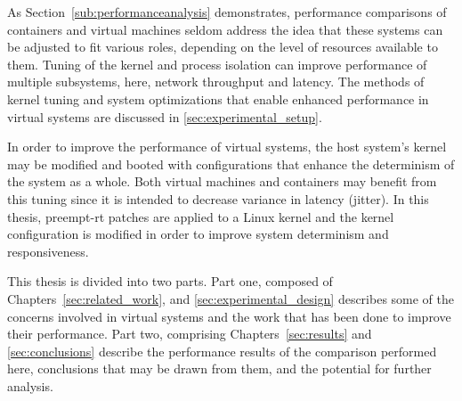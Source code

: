 As Section~\ref{sub:performanceanalysis} demonstrates, performance comparisons of containers and virtual machines seldom address the idea that these systems can be adjusted to fit various roles, depending on the level of resources available to them.  
Tuning of the kernel and process isolation can improve performance of multiple subsystems, here, network throughput and latency.  
The methods of kernel tuning and system optimizations that enable enhanced performance in virtual systems are discussed in \ref{sec:experimental_setup}.

In order to improve the performance of virtual systems, the host system's kernel may be modified and booted with configurations that enhance the determinism of the system as a whole.
Both virtual machines and containers may benefit from this tuning since it is intended to decrease variance in latency (jitter).  
In this thesis, preempt-rt patches are applied to a Linux kernel and the kernel configuration is modified in order to improve system determinism and responsiveness. 

This thesis is divided into two parts.
Part one, composed of Chapters~\ref{sec:related_work}, and \ref{sec:experimental_design} describes some of the concerns involved in virtual systems and the work that has been done to improve their performance.
Part two, comprising Chapters~\ref{sec:results} and \ref{sec:conclusions} describe the performance results of the comparison performed here, conclusions that may be drawn from them, and the potential for further analysis.
